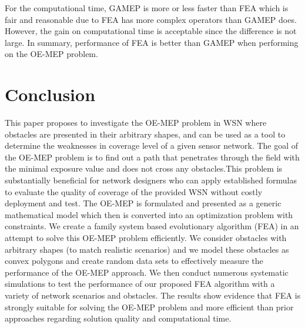 \documentclass[final]{elsarticle}
\begin{document}
For the computational time, GAMEP is more or less faster than FEA which is fair and reasonable due to FEA has more complex operators than GAMEP does. However, the gain on computational time is acceptable since the difference is not large. In summary, performance of FEA is better than GAMEP when performing on the OE-MEP problem. 

\section{Conclusion}
This paper proposes to investigate the OE-MEP problem in WSN where obstacles are presented in their arbitrary shapes, and can be used as a tool to determine the weaknesses in coverage level of a given sensor network. The goal of the OE-MEP problem is to find out a path  that penetrates through the field  with the minimal exposure value and does not cross any obstacles.This problem is substantially beneficial for network designers who can apply established formulas to evaluate the quality of coverage of the provided WSN without costly deployment and test. The OE-MEP is formulated and presented as a generic mathematical model which then is converted into an optimization problem with constraints. We create a family system based evolutionary algorithm (FEA) in an attempt to solve this OE-MEP problem efficiently. We consider obstacles with  arbitrary shapes (to match realistic scenarios) and we model these obstacles as convex polygons and create random data sets to effectively measure the performance of the OE-MEP approach. We then conduct numerous systematic simulations to test the performance of our proposed FEA algorithm with a variety of network scenarios and obstacles. The results show evidence that FEA is strongly suitable for solving the OE-MEP problem and more efficient than prior approaches regarding solution quality and computational time.


\end{document}
